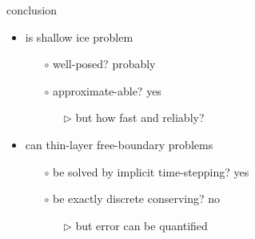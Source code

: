 \documentclass[hide notes,intlimits]{beamer}
\begin{document}
\begin{frame}{conclusion}
\begin{itemize}
\item is shallow ice problem
  \begin{itemize}
  \item[$\circ$] well-posed? \qquad \alert{probably}
  \item[$\circ$] approximate-able? \qquad \alert{yes}
     \begin{itemize}
     \item[$\triangleright$] but how fast and reliably?
     \end{itemize}
  \end{itemize}
\item can thin-layer free-boundary problems
  \begin{itemize}
  \item[$\circ$] be solved by implicit time-stepping? \qquad \alert{yes}
  \item[$\circ$] be exactly discrete conserving? \qquad \alert{no}
     \begin{itemize}
     \item[$\triangleright$] but error can be quantified
     \end{itemize}
  \end{itemize}
\end{itemize}
\end{frame}
\end{document}
